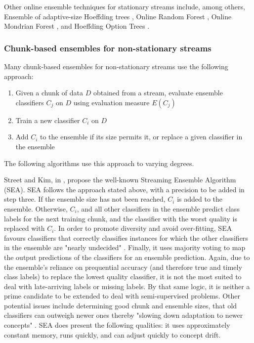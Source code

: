 Other online ensemble techniques for stationary streams include, among others, Ensemble of adaptive-size Hoeffding trees \cite{bifet2009improving}, Online Random Forest \cite{denil2013consistency, saffari2009line}, Online Mondrian Forest \cite{lakshminarayanan2014mondrian}, and Hoeffding Option Trees \cite{gama2010knowledge}.

\subsubsection{Chunk-based ensembles for non-stationary streams}
Many chunk-based ensembles for non-stationary streams use the following approach:
\begin{enumerate}
\item Given a chunk of data $D$ obtained from a stream, evaluate ensemble classifiers $C_j$ on $D$ using evaluation measure $E(C_j)$
\item Train a new classifier $C_i$ on $D$
\item Add $C_i$ to the ensemble if its size permits it, or replace a given classifier in the ensemble
\end{enumerate}

The following algorithms use this approach to varying degrees.

Street and Kim, in \cite{street2001streaming}, propose the well-known Streaming Ensemble Algorithm (SEA). SEA follows the approach stated above, with a precision to be added in step three. If the ensemble size has not been reached, $C_i$ is added to the ensemble. Otherwise, $C_i$, and all other classifiers in the ensemble predict class labels for the next training chunk, and the classifier with the worst quality is replaced with $C_i$. In order to promote diversity and avoid over-fitting, SEA favours classifiers that correctly classifies instances for which the other classifiers in the ensemble are "nearly undecided" \cite{street2001streaming}. Finally, it uses majority voting to map the output predictions of the classifiers for an ensemble prediction. Again, due to the ensemble's reliance on prequential accuracy (and therefore true and timely class labels) to replace the lowest quality classifier, it is not the most suited to deal with late-arriving labels or missing labels. By that same logic, it is neither a prime candidate to be extended to deal with semi-supervised problems. Other potential issues include determining good chunk and ensemble sizes,  that old classifiers can outweigh newer ones thereby "slowing down adaptation to newer concepts" \cite{KRAWCZYK2017132}. SEA does present the following qualities: it uses approximately constant memory, runs quickly, and can adjust quickly to concept drift.

